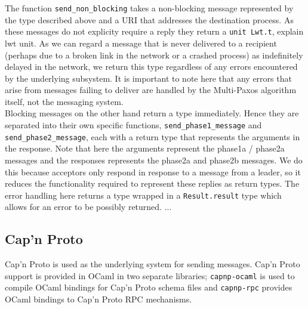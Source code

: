 The function \texttt{send\_non\_blocking} takes a non-blocking message represented by the type described above and a URI that addresses the destination process. As these messages do not explicity require a reply they return a \texttt{unit Lwt.t}, {\color{red} explain lwt unit}. As we can regard a message that is never delivered to a recipient (perhaps due to a broken link in the network or a crashed process) as indefinitely delayed in the network, we return this type regardless of any errors encountered by the underlying subsystem. It is important to note here that any errors that arise from messages failing to deliver are handled by the Multi-Paxos algorithm itself, not the messaging system. \\

Blocking messages on the other hand return a type immediately. Hence they are separated into their own specific functions, \texttt{send\_phase1\_message} and \texttt{send\_phase2\_message}, each with a return type that represents the arguments in the response. Note that here the arguments represent the phase1a / phase2a messages and the responses represents the phase2a and phase2b messages. We do this because acceptors only respond in response to a message from a leader, so it reduces the functionality required to represent these replies as return types. The error handling here returns a type wrapped in a \texttt{Result.result} type which allows for an error to be possibly returned. ... \\


\subsection{Cap'n Proto}

Cap'n Proto is used as the underlying system for sending messages. Cap'n Proto support is provided in OCaml in two separate libraries; \texttt{capnp-ocaml} is used to compile OCaml bindings for Cap'n Proto schema files and \texttt{capnp-rpc} provides OCaml bindings to Cap'n Proto RPC mechanisms. \\

